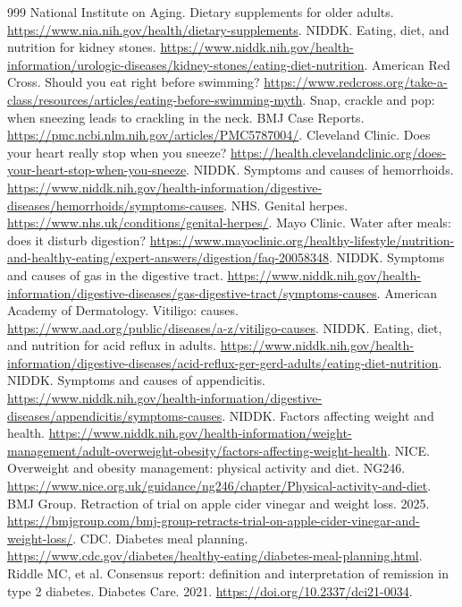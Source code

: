 \documentclass[11pt,oneside]{book}
\begin{document}
\begin{thebibliography}{999}
National Institute on Aging. Dietary supplements for older adults. \url{https://www.nia.nih.gov/health/dietary-supplements}.
NIDDK. Eating, diet, and nutrition for kidney stones. \url{https://www.niddk.nih.gov/health-information/urologic-diseases/kidney-stones/eating-diet-nutrition}.
American Red Cross. Should you eat right before swimming? \url{https://www.redcross.org/take-a-class/resources/articles/eating-before-swimming-myth}.
Snap, crackle and pop: when sneezing leads to crackling in the neck. BMJ Case Reports. \url{https://pmc.ncbi.nlm.nih.gov/articles/PMC5787004/}.
Cleveland Clinic. Does your heart really stop when you sneeze? \url{https://health.clevelandclinic.org/does-your-heart-stop-when-you-sneeze}.
NIDDK. Symptoms and causes of hemorrhoids. \url{https://www.niddk.nih.gov/health-information/digestive-diseases/hemorrhoids/symptoms-causes}.
NHS. Genital herpes. \url{https://www.nhs.uk/conditions/genital-herpes/}.
Mayo Clinic. Water after meals: does it disturb digestion? \url{https://www.mayoclinic.org/healthy-lifestyle/nutrition-and-healthy-eating/expert-answers/digestion/faq-20058348}.
NIDDK. Symptoms and causes of gas in the digestive tract. \url{https://www.niddk.nih.gov/health-information/digestive-diseases/gas-digestive-tract/symptoms-causes}.
American Academy of Dermatology. Vitiligo: causes. \url{https://www.aad.org/public/diseases/a-z/vitiligo-causes}.
NIDDK. Eating, diet, and nutrition for acid reflux in adults. \url{https://www.niddk.nih.gov/health-information/digestive-diseases/acid-reflux-ger-gerd-adults/eating-diet-nutrition}.
NIDDK. Symptoms and causes of appendicitis. \url{https://www.niddk.nih.gov/health-information/digestive-diseases/appendicitis/symptoms-causes}.
NIDDK. Factors affecting weight and health. \url{https://www.niddk.nih.gov/health-information/weight-management/adult-overweight-obesity/factors-affecting-weight-health}.
NICE. Overweight and obesity management: physical activity and diet. NG246. \url{https://www.nice.org.uk/guidance/ng246/chapter/Physical-activity-and-diet}.
BMJ Group. Retraction of trial on apple cider vinegar and weight loss. 2025. \url{https://bmjgroup.com/bmj-group-retracts-trial-on-apple-cider-vinegar-and-weight-loss/}.
CDC. Diabetes meal planning. \url{https://www.cdc.gov/diabetes/healthy-eating/diabetes-meal-planning.html}.
Riddle MC, et al. Consensus report: definition and interpretation of remission in type 2 diabetes. Diabetes Care. 2021. \url{https://doi.org/10.2337/dci21-0034}.

\end{thebibliography}
\end{document}
